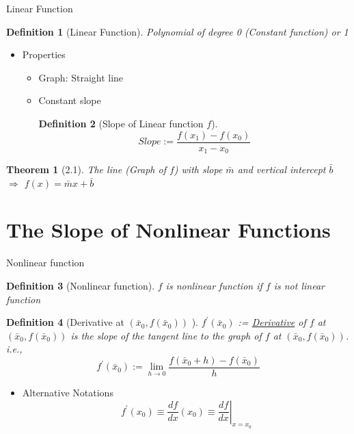 \documentclass[a4paper,11pt]{article}
\newtheorem{defn}{Definition}
\newtheorem{thm}{Theorem}
\begin{document}
\begin{frame}[t]{Linear Function}
	\begin{defn}
		[Linear Function]
		Polynomial of degree 0 (Constant function) or 1
	\end{defn}
	\begin{itemize}
		\item Properties
		\begin{itemize}
			\item Graph: Straight line
			\item Constant slope 
			\begin{defn}
				[Slope of Linear function $f$]
				\[
					Slope:= \frac{f(x_1)-f(x_0)}{x_1-x_0}
				\]
			\end{defn}
		\end{itemize}
	\end{itemize}
	\begin{thm}
		[2.1]
		The line (Graph of $f$) with slope $\bar m$ and vertical intercept $\bar b$ $\Rightarrow$ $f(x)=\bar m x + \bar b$
	\end{thm}
\end{frame}

\section{The Slope of Nonlinear Functions} %
\label{sec:the_slope_of_nonlinear_functions}

\begin{frame}[t]{Nonlinear function}
	\begin{defn}
		[Nonlinear function]
		$f$ is nonlinear function if $f$ is not linear function
	\end{defn}
	
	\begin{defn}
		[Derivative at $(\bar x_0, f(\bar x_0))$ ]
		$f^\prime(\bar x_0)$ := \uline{Derivative} of $f$ at $(\bar x_0, f(\bar x_0))$ is the slope of the tangent line to the graph of $f$ at $(\bar x_0, f(\bar x_0))$. \textit{i.e.,}
		\[
			f^\prime(\bar x_0):= \lim_{h\rightarrow 0}\frac{f(\bar x_0+h)-f(\bar x_0)}{h}
		\]
	\end{defn}
	\begin{itemize}
		\item Alternative Notations
		\[
			f^\prime(x_0) \equiv \frac{df}{dx}(x_0) \equiv \left.\frac{df}{dx}\right\vert_{x=x_0}
		\]
	\end{itemize}
\end{frame}
\end{document}
